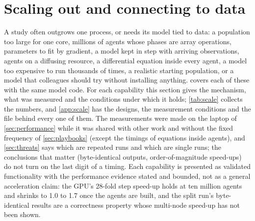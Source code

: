 \section{Scaling out and connecting to data}
\label{sec:scale}

A study often outgrows one process, or needs its model tied to data: a population too large
for one core, millions of agents whose phases are array operations, parameters to fit by
gradient, a model kept in step with arriving observations, agents on a diffusing resource,
a differential equation inside every agent, a
model too expensive to run thousands of times, a realistic starting population, or a model
that colleagues should try without installing anything. \modelly{} covers each of these with
the same model code. For each capability this section gives the mechanism, what was measured
and the conditions under which it holds; \cref{tab:scale} collects the numbers, and \cref{app:scale} has the designs, the measurement conditions
and the file behind every one of them. The measurements were made on the laptop of
\cref{sec:performance} while it was shared with other work and without the fixed frequency of
\cref{sec:playbooks} (except the timings of equations inside agents), and \cref{sec:threats} says which are repeated runs and which are single
runs; the conclusions that matter (byte-identical outputs, order-of-magnitude speed-ups) do not
turn on the last digit of a timing. Each capability is presented as validated functionality
with the performance evidence stated and bounded, not as a general acceleration claim: the
GPU's 28-fold step speed-up holds at ten million agents and shrinks to 1.0 to 1.7 once the
agents are built, and the split run's byte-identical results are a correctness property
whose multi-node speed-up has not been shown.

